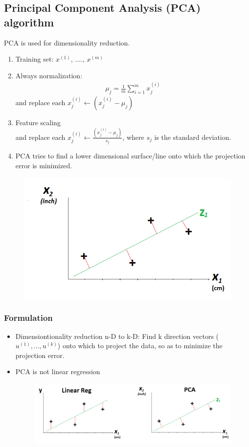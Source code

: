 \documentclass[a4paper,12pt]{report}
\begin{document}
\subsection{Principal Component Analysis (PCA) algorithm}
PCA is used for dimensionality reduction.
\begin{enumerate}
\item Training set: $x^{(1)}$, ...., $x^{(m)}$
\item Always normalization:
\begin{align}
\mu_j = \frac{1}{m} \sum_{i=1} ^m x_j ^{(i)}
\end{align}
and replace each $x_j ^{(i)} \leftarrow (x_j ^{(i)}- \mu_j)$
\item Feature scaling \\
and replace each $x_j ^{(i)} \leftarrow \frac{(x_j ^{(i)}- \mu_j)}{s_j}$, where $s_j$ is the standard deviation.
\item PCA tries to find a lower dimensional surface/line onto which the projection error is minimized.
\end{enumerate}
\begin{figure}[H]
	\centering
        \includegraphics[totalheight=6 cm]{fig6.png}\caption{}
\end{figure}
\subsubsection{Formulation}
\begin{itemize}
\item Dimensiontionality reduction n-D to k-D: Find k direction vectors ($u^{(1)},...,u^{(k)} $) onto which to project the data, so as to minimize the projection error.\\
\item PCA is not linear regression
\begin{figure}[H]
	\centering
        \includegraphics[totalheight=3 cm]{fig7.png}\caption{}
\end{figure}
\end{itemize}
\end{document}
